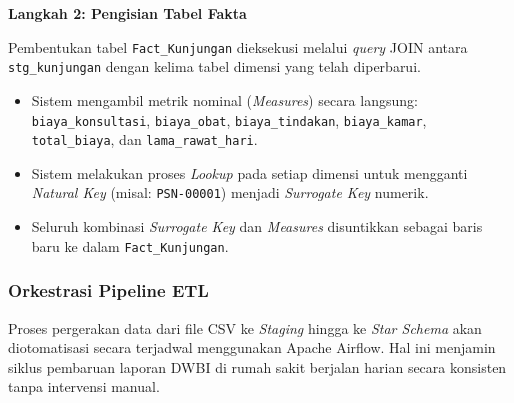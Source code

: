 \textbf{Langkah 2: Pengisian Tabel Fakta}
 
Pembentukan tabel \texttt{Fact\_Kunjungan} dieksekusi melalui \textit{query} JOIN antara \texttt{stg\_kunjungan} dengan kelima tabel dimensi yang telah diperbarui.
 
\begin{itemize}
    \item Sistem mengambil metrik nominal (\textit{Measures}) secara langsung: \texttt{biaya\_konsultasi}, \texttt{biaya\_obat}, \texttt{biaya\_tindakan}, \texttt{biaya\_kamar}, \texttt{total\_biaya}, dan \texttt{lama\_rawat\_hari}.
    \item Sistem melakukan proses \textit{Lookup} pada setiap dimensi untuk mengganti \textit{Natural Key} (misal: \texttt{PSN-00001}) menjadi \textit{Surrogate Key} numerik.
    \item Seluruh kombinasi \textit{Surrogate Key} dan \textit{Measures} disuntikkan sebagai baris baru ke dalam \texttt{Fact\_Kunjungan}.
\end{itemize}
 
\subsubsection{Orkestrasi Pipeline ETL}
 
Proses pergerakan data dari file CSV ke \textit{Staging} hingga ke \textit{Star Schema} akan diotomatisasi secara terjadwal menggunakan Apache Airflow. Hal ini menjamin siklus pembaruan laporan DWBI di rumah sakit berjalan harian secara konsisten tanpa intervensi manual.
 
